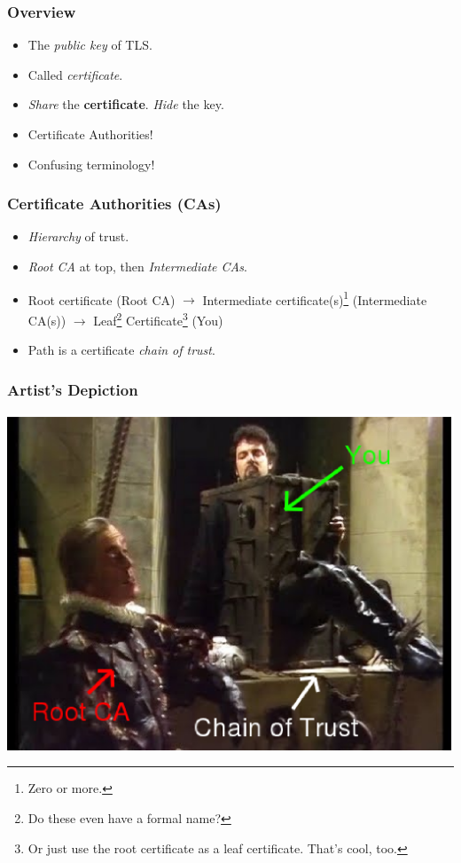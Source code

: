 \documentclass[xcolor={dvipsnames,svgnames},hyperref=dvips]{beamer}
\begin{document}
	\begin{frame}
		\frametitle{Overview}
		\begin{itemize}
		\item The \textit{public key} of TLS.
		\item Called \textit{certificate}.
		\item \textit{Share} the \textbf{certificate}.  \textit{Hide} the key.
		\item Certificate Authorities!
		\item Confusing terminology!
		\end{itemize}
	\end{frame}

	\begin{frame}
		\frametitle{Certificate Authorities (CAs)}
		\begin{itemize}
		\item \textit{Hierarchy} of trust.
		\item \textit{Root CA} at top, then \textit{Intermediate CAs}.
		\item Root certificate (Root CA) $\rightarrow$ Intermediate certificate(s)\footnote{Zero or more.} (Intermediate CA(s)) $\rightarrow$ Leaf\footnote{Do these even have a formal name?} Certificate\footnote{Or just use the root certificate as a leaf certificate.  That's cool, too.} (You)
		\item Path is a certificate \textit{chain of trust}.
		\end{itemize}
	\end{frame}

	\begin{frame}
		\frametitle{Artist's Depiction}
		\center\includegraphics[scale=0.5]{chainoftrustpt1.ps}
	\end{frame}
\end{document}
